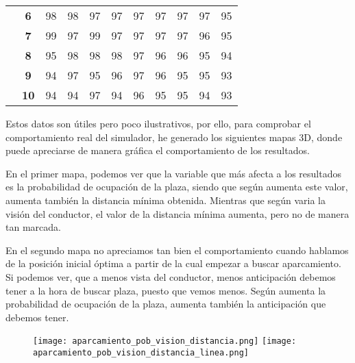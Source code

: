 \begin{table}[h]
{\begin{tabular}{ccrrrrrrrrr}
\multicolumn{1}{c|}{} & \multicolumn{1}{c|}{\textbf{6}} & \multicolumn{1}{r|}{98} & \multicolumn{1}{r|}{98} & \multicolumn{1}{r|}{97} & \multicolumn{1}{r|}{97} & \multicolumn{1}{r|}{97} & \multicolumn{1}{r|}{97} & \multicolumn{1}{r|}{97} & \multicolumn{1}{r|}{97} & \multicolumn{1}{r|}{95} \\ \cline{2-11}
\multicolumn{1}{c|}{} & \multicolumn{1}{c|}{\textbf{7}} & \multicolumn{1}{r|}{99} & \multicolumn{1}{r|}{97} & \multicolumn{1}{r|}{99} & \multicolumn{1}{r|}{97} & \multicolumn{1}{r|}{97} & \multicolumn{1}{r|}{97} & \multicolumn{1}{r|}{97} & \multicolumn{1}{r|}{96} & \multicolumn{1}{r|}{95} \\ \cline{2-11}
\multicolumn{1}{c|}{} & \multicolumn{1}{c|}{\textbf{8}} & \multicolumn{1}{r|}{95} & \multicolumn{1}{r|}{98} & \multicolumn{1}{r|}{98} & \multicolumn{1}{r|}{98} & \multicolumn{1}{r|}{97} & \multicolumn{1}{r|}{96} & \multicolumn{1}{r|}{96} & \multicolumn{1}{r|}{95} & \multicolumn{1}{r|}{94} \\ \cline{2-11}
\multicolumn{1}{c|}{} & \multicolumn{1}{c|}{\textbf{9}} & \multicolumn{1}{r|}{94} & \multicolumn{1}{r|}{97} & \multicolumn{1}{r|}{95} & \multicolumn{1}{r|}{96} & \multicolumn{1}{r|}{97} & \multicolumn{1}{r|}{96} & \multicolumn{1}{r|}{95} & \multicolumn{1}{r|}{95} & \multicolumn{1}{r|}{93} \\ \cline{2-11}
\multicolumn{1}{c|}{} & \multicolumn{1}{c|}{\textbf{10}} & \multicolumn{1}{r|}{94} & \multicolumn{1}{r|}{94} & \multicolumn{1}{r|}{97} & \multicolumn{1}{r|}{94} & \multicolumn{1}{r|}{96} & \multicolumn{1}{r|}{95} & \multicolumn{1}{r|}{95} & \multicolumn{1}{r|}{94} & \multicolumn{1}{r|}{93} \\ \cline{2-11}
\end{tabular}%
}
\end{table}

Estos datos son útiles pero poco ilustrativos, por ello, para comprobar el comportamiento real del simulador, he generado los siguientes mapas 3D, donde puede apreciarse de manera gráfica el comportamiento de los resultados.

En el primer mapa, podemos ver que la variable que más afecta a los resultados es la probabilidad de ocupación de la plaza, siendo que según aumenta este valor, aumenta también la distancia mínima obtenida. Mientras que según varia la visión del conductor, el valor de la distancia mínima aumenta, pero no de manera tan marcada.

En el segundo mapa no apreciamos tan bien el comportamiento cuando hablamos de la posición inicial óptima a partir de la cual empezar a buscar aparcamiento. Si podemos ver, que a menos vista del conductor, menos anticipación debemos tener a la hora de buscar plaza, puesto que vemos menos. Según aumenta la probabilidad de ocupación de la plaza, aumenta también la anticipación que debemos tener.

\begin{figure}[h]
\texttt{[image: aparcamiento\_pob\_vision\_distancia.png]}
\texttt{[image: aparcamiento\_pob\_vision\_distancia\_linea.png]}
\centering
\end{figure}
